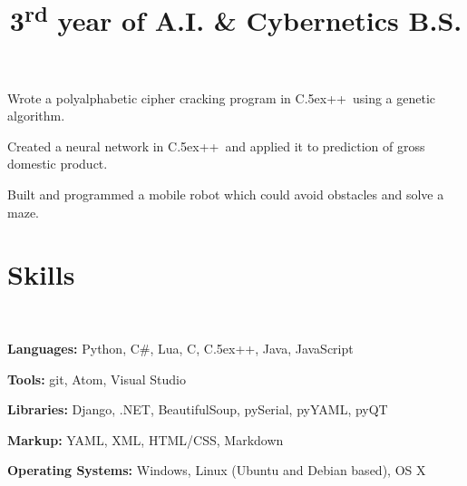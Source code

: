 \documentclass[12pt, tweaklist, line]{res}
\let\tempone\itemize
\let\temptwo\enditemize
\renewenvironment{itemize}{\tempone\vspace{-.15in}\setlength{\topsep}{0pt}\setlength{\itemsep}{3pt}\vspace{-.15in}}{\temptwo}
\def\Cplusplus{{\rm C\raise.5ex\hbox{\small ++}}}
\newcommand{\ts}{\textsuperscript}
\begin{document}
\begin{resume}
\title{3\ts{rd} year of A.I. \& Cybernetics B.S. }
\begin{position}
\begin{itemize}
\item Wrote a polyalphabetic cipher cracking program in \Cplusplus~using a genetic algorithm.
\item Created a neural network in \Cplusplus~and applied it to prediction of gross domestic product.
\item Built and programmed a mobile robot which could avoid obstacles and solve a maze.
\end{itemize}
\end{position}

\pagebreak

\section{Skills}

~\\ %

\begin{itemize}
\item \textbf{Languages:} Python, C\#, Lua, C, \Cplusplus, Java, JavaScript
\item \textbf{Tools:} git, Atom, Visual Studio
\item \textbf{Libraries:} Django, .NET, BeautifulSoup, pySerial, pyYAML, pyQT
\item \textbf{Markup:} YAML, XML, HTML/CSS, Markdown
\item \textbf{Operating Systems:} Windows, Linux (Ubuntu and Debian based), OS X
\end{itemize}

\end{resume}
\end{document}
